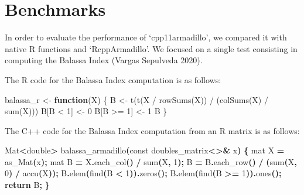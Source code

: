 \documentclass[preprint,12pt]{elsarticle}
\newenvironment{Shaded}{\begin{snugshade}}{\end{snugshade}}
\newcommand{\AttributeTok}[1]{\textcolor[rgb]{0.77,0.63,0.00}{#1}}
\newcommand{\ControlFlowTok}[1]{\textcolor[rgb]{0.13,0.29,0.53}{\textbf{#1}}}
\newcommand{\DataTypeTok}[1]{\textcolor[rgb]{0.13,0.29,0.53}{#1}}
\newcommand{\DecValTok}[1]{\textcolor[rgb]{0.00,0.00,0.81}{#1}}
\newcommand{\FunctionTok}[1]{\textcolor[rgb]{0.00,0.00,0.00}{#1}}
\newcommand{\NormalTok}[1]{#1}
\newcommand{\OperatorTok}[1]{\textcolor[rgb]{0.81,0.36,0.00}{\textbf{#1}}}
\newcommand{\OtherTok}[1]{\textcolor[rgb]{0.56,0.35,0.01}{#1}}
\newcommand{\SpecialCharTok}[1]{\textcolor[rgb]{0.00,0.00,0.00}{#1}}
\begin{document}
\section{Benchmarks}\label{benchmarks}

In order to evaluate the performance of `cpp11armadillo', we compared it
with native R functions and `RcppArmadillo'. We focused on a single test
consisting in computing the Balassa Index (Vargas Sepulveda 2020).

The R code for the Balassa Index computation is as follows:

\begin{Shaded}
\begin{Highlighting}[]
\NormalTok{balassa\_r }\OtherTok{\textless{}{-}} \ControlFlowTok{function}\NormalTok{(X) \{}
\NormalTok{  B }\OtherTok{\textless{}{-}} \FunctionTok{t}\NormalTok{(}\FunctionTok{t}\NormalTok{(X }\SpecialCharTok{/} \FunctionTok{rowSums}\NormalTok{(X)) }\SpecialCharTok{/}\NormalTok{ (}\FunctionTok{colSums}\NormalTok{(X) }\SpecialCharTok{/} \FunctionTok{sum}\NormalTok{(X)))}
\NormalTok{  B[B }\SpecialCharTok{\textless{}} \DecValTok{1}\NormalTok{] }\OtherTok{\textless{}{-}} \DecValTok{0}
\NormalTok{  B[B }\SpecialCharTok{\textgreater{}=} \DecValTok{1}\NormalTok{] }\OtherTok{\textless{}{-}} \DecValTok{1}
\NormalTok{  B}
\NormalTok{\}}
\end{Highlighting}
\end{Shaded}

The C++ code for the Balassa Index computation from an R matrix is as
follows:

\begin{Shaded}
\begin{Highlighting}[]
\NormalTok{Mat}\OperatorTok{\textless{}}\DataTypeTok{double}\OperatorTok{\textgreater{}}\NormalTok{ balassa\_armadillo}\OperatorTok{(}\AttributeTok{const}\NormalTok{ doubles\_matrix}\OperatorTok{\textless{}\textgreater{}\&}\NormalTok{ x}\OperatorTok{)} \OperatorTok{\{}
\NormalTok{  mat X }\OperatorTok{=}\NormalTok{ as\_Mat}\OperatorTok{(}\NormalTok{x}\OperatorTok{);}
\NormalTok{  mat B }\OperatorTok{=}\NormalTok{ X}\OperatorTok{.}\NormalTok{each\_col}\OperatorTok{()} \OperatorTok{/}\NormalTok{ sum}\OperatorTok{(}\NormalTok{X}\OperatorTok{,} \DecValTok{1}\OperatorTok{);}
\NormalTok{  B }\OperatorTok{=}\NormalTok{ B}\OperatorTok{.}\NormalTok{each\_row}\OperatorTok{()} \OperatorTok{/} \OperatorTok{(}\NormalTok{sum}\OperatorTok{(}\NormalTok{X}\OperatorTok{,} \DecValTok{0}\OperatorTok{)} \OperatorTok{/}\NormalTok{ accu}\OperatorTok{(}\NormalTok{X}\OperatorTok{));}
\NormalTok{  B}\OperatorTok{.}\NormalTok{elem}\OperatorTok{(}\NormalTok{find}\OperatorTok{(}\NormalTok{B }\OperatorTok{\textless{}} \DecValTok{1}\OperatorTok{)).}\NormalTok{zeros}\OperatorTok{();}
\NormalTok{  B}\OperatorTok{.}\NormalTok{elem}\OperatorTok{(}\NormalTok{find}\OperatorTok{(}\NormalTok{B }\OperatorTok{\textgreater{}=} \DecValTok{1}\OperatorTok{)).}\NormalTok{ones}\OperatorTok{();}
  \ControlFlowTok{return}\NormalTok{ B}\OperatorTok{;}
\OperatorTok{\}}
\end{Highlighting}
\end{Shaded}
\end{document}
